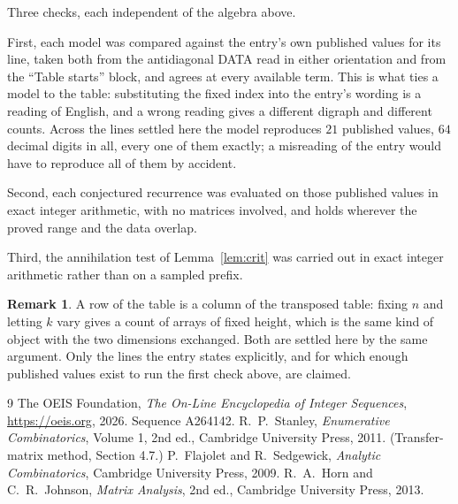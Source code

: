 \documentclass[11pt,a4paper]{article}
\theoremstyle{plain}
\theoremstyle{definition}
\newtheorem{remark}[theorem]{Remark}
\begin{document}
Three checks, each independent of the algebra above.

First, each model was compared against the entry's own published values for its line, taken
both from the antidiagonal DATA read in either orientation and from the ``Table starts''
block, and agrees at every available term. This is what ties a model to the table:
substituting the fixed index into the entry's wording is a reading of English, and a wrong
reading gives a different digraph and different counts. Across the lines settled here the
model reproduces $21$ published values, $64$ decimal digits in all, every one of
them exactly; a misreading of the entry would have to reproduce all of them by accident.

Second, each conjectured recurrence was evaluated on those published values in exact
integer arithmetic, with no matrices involved, and holds wherever the proved range and the
data overlap.

Third, the annihilation test of Lemma~\ref{lem:crit} was carried out in exact integer
arithmetic rather than on a sampled prefix.

\begin{remark}
A row of the table is a column of the transposed table: fixing $n$ and letting $k$ vary gives a
count of arrays of fixed height, which is the same kind of object with the two dimensions
exchanged. Both are settled here by the same argument. Only the lines the entry states
explicitly, and for which enough published values exist to run the first check above, are
claimed.
\end{remark}

\begin{thebibliography}{9}
 The OEIS Foundation, \emph{The On-Line Encyclopedia of Integer
Sequences}, \url{https://oeis.org}, 2026. Sequence A264142.
 R.~P.~Stanley, \emph{Enumerative Combinatorics}, Volume 1, 2nd ed.,
Cambridge University Press, 2011. (Transfer-matrix method, Section 4.7.)
 P.~Flajolet and R.~Sedgewick, \emph{Analytic Combinatorics}, Cambridge
University Press, 2009.
 R.~A.~Horn and C.~R.~Johnson, \emph{Matrix Analysis}, 2nd ed., Cambridge
University Press, 2013.
\end{thebibliography}
\end{document}
